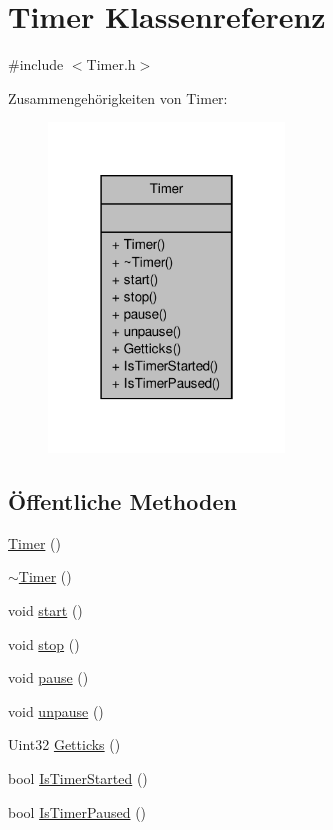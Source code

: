 \hypertarget{class_timer}{\section{Timer Klassenreferenz}
\label{class_timer}
}


{\ttfamily \#include $<$Timer.\-h$>$}



Zusammengehörigkeiten von Timer\-:
\nopagebreak
\begin{figure}[H]
\begin{center}
\leavevmode
\includegraphics[width=178pt]{class_timer__coll__graph}
\end{center}
\end{figure}
\subsection*{Öffentliche Methoden}
\begin{DoxyCompactItemize}
\item 
\hyperlink{class_timer_a5f16e8da27d2a5a5242dead46de05d97}{Timer} ()
\item 
\hyperlink{class_timer_a14fa469c4c295c5fa6e66a4ad1092146}{$\sim$\-Timer} ()
\item 
void \hyperlink{class_timer_a3a8b5272198d029779dc9302a54305a8}{start} ()
\item 
void \hyperlink{class_timer_a63f0eb44b27402196590a03781515dba}{stop} ()
\item 
void \hyperlink{class_timer_a0289effad7b573c508bc27e405900a23}{pause} ()
\item 
void \hyperlink{class_timer_aa4dd50d7ed48ac73efed2950749d35d6}{unpause} ()
\item 
Uint32 \hyperlink{class_timer_a419af9cdb3d77331954a78a9c877de11}{Getticks} ()
\item 
bool \hyperlink{class_timer_a6bbccc880351d19cedc6686b8a502127}{Is\-Timer\-Started} ()
\item 
bool \hyperlink{class_timer_addc24cd782c4d73db0a929894960ccf2}{Is\-Timer\-Paused} ()
\end{DoxyCompactItemize}


